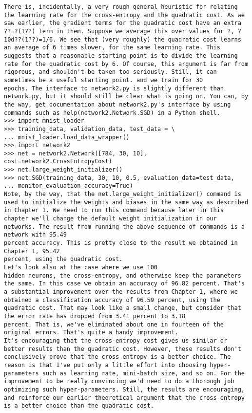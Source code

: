 \begin{lstlisting}
There is, incidentally, a very rough general heuristic for relating the learning rate for the cross-entropy and the quadratic cost. As we saw earlier, the gradient terms for the quadratic cost have an extra ??=?(1??) term in them. Suppose we average this over values for ?, ?10d??(1??)=1/6. We see that (very roughly) the quadratic cost learns an average of 6 times slower, for the same learning rate. This suggests that a reasonable starting point is to divide the learning rate for the quadratic cost by 6. Of course, this argument is far from rigorous, and shouldn't be taken too seriously. Still, it can sometimes be a useful starting point. and we train for 30
epochs. The interface to network2.py is slightly different than network.py, but it should still be clear what is going on. You can, by the way, get documentation about network2.py's interface by using commands such as help(network2.Network.SGD) in a Python shell.
>>> import mnist_loader
>>> training_data, validation_data, test_data = \
... mnist_loader.load_data_wrapper()
>>> import network2
>>> net = network2.Network([784, 30, 10], cost=network2.CrossEntropyCost)
>>> net.large_weight_initializer()
>>> net.SGD(training_data, 30, 10, 0.5, evaluation_data=test_data,
... monitor_evaluation_accuracy=True)
Note, by the way, that the net.large_weight_initializer() command is used to initialize the weights and biases in the same way as described in Chapter 1. We need to run this command because later in this chapter we'll change the default weight initialization in our networks. The result from running the above sequence of commands is a network with 95.49
percent accuracy. This is pretty close to the result we obtained in Chapter 1, 95.42
percent, using the quadratic cost.
Let's look also at the case where we use 100
hidden neurons, the cross-entropy, and otherwise keep the parameters the same. In this case we obtain an accuracy of 96.82 percent. That's a substantial improvement over the results from Chapter 1, where we obtained a classification accuracy of 96.59 percent, using the quadratic cost. That may look like a small change, but consider that the error rate has dropped from 3.41 percent to 3.18
percent. That is, we've eliminated about one in fourteen of the original errors. That's quite a handy improvement.
It's encouraging that the cross-entropy cost gives us similar or better results than the quadratic cost. However, these results don't conclusively prove that the cross-entropy is a better choice. The reason is that I've put only a little effort into choosing hyper-parameters such as learning rate, mini-batch size, and so on. For the improvement to be really convincing we'd need to do a thorough job optimizing such hyper-parameters. Still, the results are encouraging, and reinforce our earlier theoretical argument that the cross-entropy is a better choice than the quadratic cost.

\end{lstlisting}
